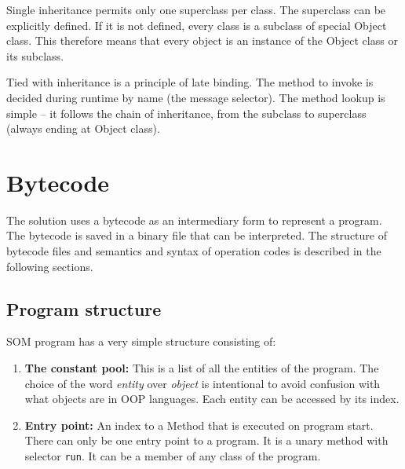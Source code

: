 \documentclass[thesis=M,english]{FITthesis}[2019/12/23]
\begin{document}
Single inheritance permits only one superclass per class. The superclass can be explicitly defined. If it is not defined,
every class is a subclass of special Object class. This therefore means that every object is an instance of the Object class
or its subclass.

Tied with inheritance is a principle of late binding. The method to invoke is decided during runtime by name (the message selector). 
The method lookup is simple -- it follows the chain of inheritance, from the subclass to superclass (always ending at Object class). 

\section{Bytecode}
The solution uses a bytecode as an intermediary form to represent a program. The bytecode is saved in a binary file that can be
interpreted. The structure of bytecode files and semantics and syntax of operation codes is described in the following sections.

\subsection{Program structure}
SOM program has a very simple structure consisting of:
\begin{enumerate}
	\item \textbf{The constant pool:} This is a list of all the entities of the program. The choice of the word \textit{entity}
		over \textit{object} is intentional to avoid confusion with what objects are in OOP languages. Each entity can be accessed
		by its index.
	\item \textbf{Entry point: } An index to a Method that is executed on program start. There can only be one entry point to a
		program. It is a unary method with selector \texttt{run}. It can be a member of any class of the program.  
\end{enumerate}
\end{document}
